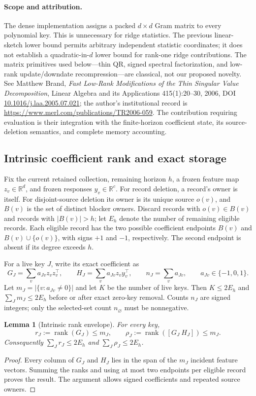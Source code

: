 \documentclass[11pt,a4paper]{article}
\newtheorem{lemma}[theorem]{Lemma}
\begin{document}
\paragraph{Scope and attribution.}
The dense implementation assigns a packed $d\times d$ Gram matrix to every
polynomial key. This is unnecessary for ridge statistics. The previous
linear-sketch lower bound permits arbitrary independent statistic coordinates;
it does not establish a quadratic-in-$d$ lower bound for rank-one ridge
contributions. The matrix primitives used below---thin QR, signed spectral
factorization, and low-rank update/downdate recompression---are classical, not
our proposed novelty. See Matthew Brand, \emph{Fast Low-Rank Modifications of
the Thin Singular Value Decomposition}, Linear Algebra and its Applications
415(1):20--30, 2006, DOI \href{https://doi.org/10.1016/j.laa.2005.07.021}{10.1016/j.laa.2005.07.021};
the author's institutional record is
\url{https://www.merl.com/publications/TR2006-059}.
The contribution requiring evaluation is their integration with the
finite-horizon coefficient state, its source-deletion semantics, and complete
memory accounting.

\subsection{Intrinsic coefficient rank and exact storage}
Fix the current retained collection, remaining horizon $h$, a frozen feature
map $z_v\in\mathbb R^d$, and frozen responses $y_v\in\mathbb R^c$. For record
deletion, a record's owner is itself. For disjoint-source deletion its owner
is its unique source $o(v)$, and $B(v)$ is the set of distinct blocker owners.
Discard records with $o(v)\in B(v)$ and records with $|B(v)|>h$; let $E_h$
denote the number of remaining eligible records. Each eligible record has
the two possible coefficient endpoints $B(v)$ and $B(v)\cup\{o(v)\}$, with
signs $+1$ and $-1$, respectively. The second endpoint is absent if its
degree exceeds $h$.

For a live key $J$, write its exact coefficient as
\[
 G_J=\sum_v a_{Jv}z_vz_v^\top,\qquad
 H_J=\sum_v a_{Jv}z_vy_v^\top,\qquad
 n_J=\sum_v a_{Jv},\qquad a_{Jv}\in\{-1,0,1\}.
\]
Let $m_J=|\{v:a_{Jv}\ne0\}|$ and let $K$ be the number of live keys.
Then $K\le2E_h$ and $\sum_Jm_J\le2E_h$ before or after exact zero-key
removal. Counts $n_J$ are signed integers; only the selected-set count
$n_\varnothing$ must be nonnegative.

\begin{lemma}[Intrinsic rank envelope]
For every key,
\[
 r_J:=\operatorname{rank}(G_J)\le m_J,
 \qquad
 \rho_J:=\operatorname{rank}([G_J\ H_J])\le m_J.
\]
Consequently $\sum_Jr_J\le2E_h$ and $\sum_J\rho_J\le2E_h$.
\end{lemma}
\begin{proof}
Every column of $G_J$ and $H_J$ lies in the span of the $m_J$ incident
feature vectors. Summing the ranks and using at most two endpoints per
eligible record proves the result. The argument allows signed coefficients
and repeated source owners.
\end{proof}
\end{document}
